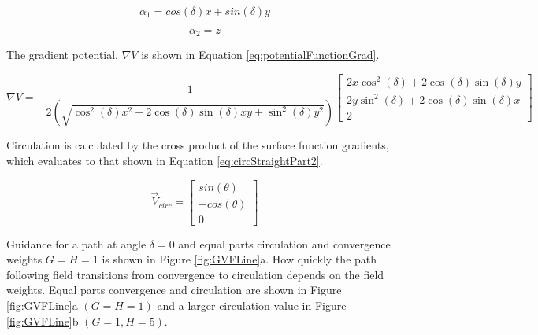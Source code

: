 \documentclass[numbered,pdftex]{ohio-etd}
\begin{document}
\begin{equation}
\label{eq:pathFunction}
\alpha_1 = cos(\delta)x + sin(\delta)y
\end{equation}

\begin{equation}
\label{eq:pathFunctionZ}
\alpha_2 = z
\end{equation}

\noindent
The gradient potential, $\nabla V$ is shown in Equation \ref{eq:potentialFunctionGrad}.

\begin{equation}
\label{eq:potentialFunctionGrad}
\nabla V = -\frac{1}{2(\sqrt{\cos^2(\delta) x^2+2\cos(\delta)\sin(\delta) xy +\sin^2 (\delta) y^2})} \begin{bmatrix}
2x\cos^2(\delta) + 2\cos(\delta)\sin(\delta) y \\
2y\sin^2(\delta) + 2\cos(\delta)\sin(\delta) x \\
2
\end{bmatrix}
\end{equation}

\noindent
Circulation is calculated by the cross product of the surface function gradients, which evaluates to that shown in Equation \ref{eq:circStraightPart2}.



\begin{equation}
\label{eq:circStraightPart2}
\overrightarrow{V}_{circ} = \begin{bmatrix}
sin(\theta) \\
-cos(\theta) \\
0
\end{bmatrix}
\end{equation}

Guidance for a path at angle $\delta = 0$ and equal parts circulation and convergence weights $G=H=1$ is shown in Figure \ref{fig:GVFLine}a. How quickly the path following field transitions from convergence to circulation depends on the field weights. Equal parts convergence and circulation are shown in Figure \ref{fig:GVFLine}a $(G=H=1)$ and a larger circulation value in Figure \ref{fig:GVFLine}b $(G=1, H=5)$. \\
\end{document}
